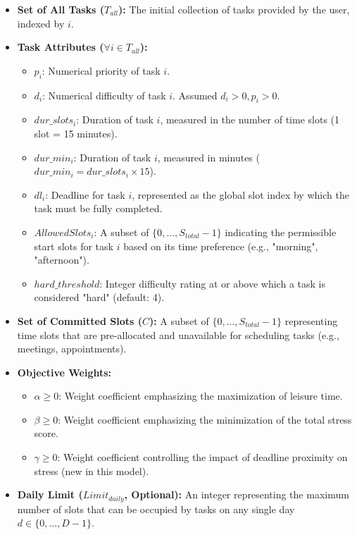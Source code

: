\documentclass{article}
\begin{document}
\begin{itemize}
    \item \textbf{Set of All Tasks ($T_{all}$):} The initial collection of tasks provided by the user, indexed by $i$.
    \item \textbf{Task Attributes ($\forall i \in T_{all}$):}
    \begin{itemize}
        \item $p_i$: Numerical priority of task $i$.
        \item $d_i$: Numerical difficulty of task $i$. Assumed $d_i > 0, p_i > 0$.
        \item $dur\_slots_i$: Duration of task $i$, measured in the number of time slots (1 slot = 15 minutes).
        \item $dur\_min_i$: Duration of task $i$, measured in minutes ($dur\_min_i = dur\_slots_i \times 15$).
        \item $dl_i$: Deadline for task $i$, represented as the global slot index by which the task must be fully completed.
        \item $AllowedSlots_i$: A subset of $\{0, ..., S_{total}-1\}$ indicating the permissible start slots for task $i$ based on its time preference (e.g., "morning", "afternoon").
        \item $hard\_threshold$: Integer difficulty rating at or above which a task is considered "hard" (default: 4).
    \end{itemize}
    \item \textbf{Set of Committed Slots ($C$):} A subset of $\{0, ..., S_{total}-1\}$ representing time slots that are pre-allocated and unavailable for scheduling tasks (e.g., meetings, appointments).
    \item \textbf{Objective Weights:}
    \begin{itemize}
        \item $\alpha \ge 0$: Weight coefficient emphasizing the maximization of leisure time.
        \item $\beta \ge 0$: Weight coefficient emphasizing the minimization of the total stress score.
        \item $\gamma \ge 0$: Weight coefficient controlling the impact of deadline proximity on stress (new in this model).
    \end{itemize}
    \item \textbf{Daily Limit ($Limit_{daily}$, Optional):} An integer representing the maximum number of slots that can be occupied by tasks on any single day $d \in \{0, ..., D-1\}$.
\end{itemize}
\end{document}
